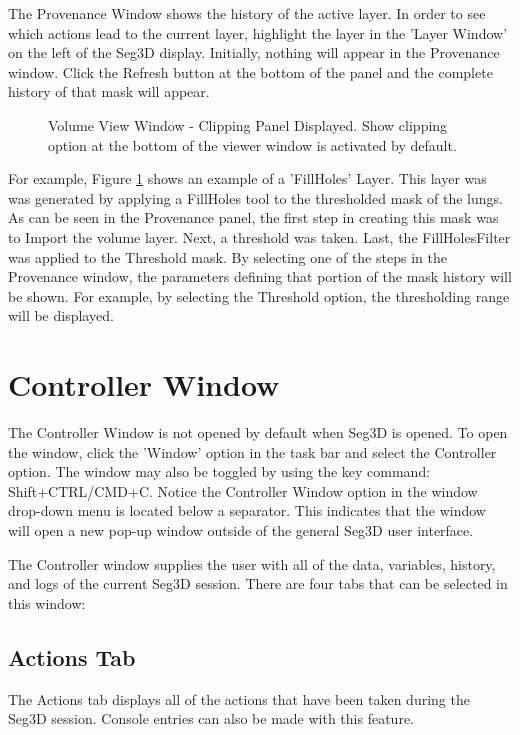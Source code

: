 \documentclass[fleqn,11pt,openany]{book}
\begin{document}
The Provenance Window shows the history of the active layer.  
In order to see which actions lead to the current layer, highlight the layer in the 'Layer Window' on the left of the Seg3D display.
Initially, nothing will appear in the Provenance window.
Click the Refresh button at the bottom of the panel and the complete history of that mask will appear.

\begin{figure}[b!]
\caption{Volume View Window - Clipping Panel Displayed. Show clipping option at the bottom of the viewer window is activated by default.}\label{fig:ProvenanceWindow}
\end{figure}

For example, Figure \ref{fig:ProvenanceWindow} shows an example of a 'FillHoles' Layer.
This layer was was generated by applying a FillHoles tool to the thresholded mask of the lungs.
As can be seen in the Provenance panel, the first step in creating this mask was to Import the volume layer.  
Next, a threshold was taken.  Last, the FillHolesFilter was applied to the Threshold mask.
By selecting one of the steps in the Provenance window, the parameters defining that portion of the mask history will be shown.
For example, by selecting the Threshold option, the thresholding range will be displayed.

\section{Controller Window}
The Controller Window is not opened by default when Seg3D is opened.  To open the window, click the 'Window' option in the task bar and select the Controller option.  The window may also be toggled by using the key command: Shift+CTRL/CMD+C.
Notice the Controller Window option in the window drop-down menu is located below a separator.  
This indicates that the window will open a new pop-up window outside of the general Seg3D user interface.

The Controller window supplies the user with all of the data, variables, history, and logs of the current Seg3D session.
There are four tabs that can be selected in this window:

\subsection{Actions Tab}
The Actions tab displays all of the actions that have been taken during the Seg3D session.
Console entries can also be made with this feature.
\end{document}
